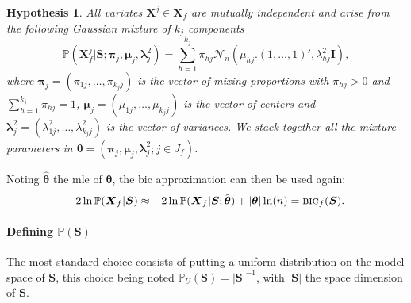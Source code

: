 \documentclass[11pt,a4paper]{article}
\newtheorem{hyp}{Hypothesis}
\begin{document}
\begin{hyp}\label{H4}
All variates $\boldsymbol{X}^j\in\boldsymbol{X}_f$ are mutually independent and arise from the following Gaussian mixture of $k_j$ components
\begin{equation}
\mathbb{P}(\boldsymbol{X}_f^j|\boldsymbol{S};\boldsymbol{\pi}_{j},\boldsymbol{\mu}_j,\boldsymbol{\lambda}^2_j) = \sum_{h=1}^{k_j} \pi_{hj} \mathcal{N}_n(\mu_{hj} . (1,\ldots,1)',\lambda_{hj}^2\boldsymbol{I}),
\end{equation}
where $\boldsymbol{\pi}_{j}=(\pi_{1j},\ldots,\pi_{k_jj})$ is the vector of mixing proportions with $\pi_{hj}>0$ and $\sum_{h=1}^{k_j}\pi_{hj}=1$, $\boldsymbol{\mu}_j=(\mu_{1j},\ldots,\mu_{k_jj})$  is the vector of centers and $\boldsymbol{\lambda}^2_j=(\lambda^2_{1j},\ldots,\lambda^2_{k_jj})$ is the vector of variances. We stack together all the mixture parameters in $\boldsymbol{\theta}=(\boldsymbol{\pi}_{j},\boldsymbol{\mu}_j,\boldsymbol{\lambda}^2_j ; j \in J_f)$.
\end{hyp}

\vspace{3mm}

Noting $\hat{\boldsymbol{\theta}}$ the {\sc mle} of $\boldsymbol{\theta}$, the {\sc bic} approximation can then be used again:
\begin{equation}
-2\ln \mathbb{P}(\boldsymbol{X}_f|\boldsymbol{S}) \approx -2\ln \mathbb{P}(\boldsymbol{X}_f|\boldsymbol{S};\hat{\boldsymbol{\theta}}) + |{\boldsymbol{\theta}}| \ln(n) = \mbox{{\sc bic}}_f(\boldsymbol{S}).
\end{equation}

\paragraph{Defining $\mathbb{P}(\boldsymbol{S})$} The most standard choice consists of putting a uniform distribution on the model space of $\boldsymbol{S}$, this choice being noted $\mathbb{P}_U(\boldsymbol{S}) = |\boldsymbol{S}|^{-1}$, with $|\boldsymbol{S}|$ the space dimension of $\boldsymbol{S}$.
\end{document}

